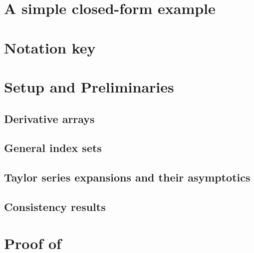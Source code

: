 




\appendix

\section{A simple closed-form example}



\section{Notation key}


\section{Setup and Preliminaries}

\subsection{Derivative arrays}


\subsection{General index sets}


\subsection{Taylor series expansions and their asymptotics}


\subsection{Consistency results}




\section{Proof of }


